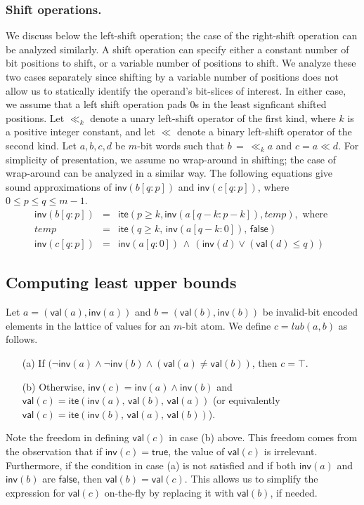\documentclass{llncs}
\newcommand{\val}{\ensuremath{\mathsf{val}}}
\newcommand{\inv}{\ensuremath{\mathsf{inv}}}
\newcommand{\ite}{\ensuremath{\mathsf{ite}}}
\newcommand{\true}{\ensuremath{\mathsf{true}}}
\newcommand{\false}{\ensuremath{\mathsf{false}}}
\begin{document}
\subsubsection{Shift operations.} We discuss below the
left-shift operation; the case of the right-shift operation can be
analyzed similarly.  A shift operation can specify either a constant
number of bit positions to shift, or a variable number of positions to
shift.  We analyze these two cases separately since shifting by a
variable number of positions does not allow us to statically identify
the operand's bit-slices of interest.  In either case, we assume that
a left shift operation pads $0$s in the least signficant shifted
positions.  Let $\ll_k$ denote a unary left-shift operator of the
first kind, where $k$ is a positive integer constant, and let $\ll$
denote a binary left-shift operator of the second kind.  Let $a, b, c,
d$ be $m$-bit words such that $b \,=\, \ll_k a$ and $c = a \ll d$.
For simplicity of presentation, we assume no wrap-around in shifting;
the case of wrap-around can be analyzed in a similar way.  The
following equations give sound approximations of ${\inv}(b[q:p])$ and
${\inv}(c[q:p])$, where $0 \le p \le q \le m-1$.
\vspace*{-0.03in}
\begin{eqnarray}
{\inv}(b[q:p]) \!\!&\!\!=\!\! & \!\! {\ite}(p \ge k, {\inv}(a[q-k:p-k]), temp), \!\!\text{ where }\nonumber \\
temp      \!\!   &\!\! =\!\! & \!\! {\ite}(q \ge k, \,{\inv}(a[q-k:0]), \,{\false}) \!\!\!\!\!\! \!\!\!\!\!\!\!\!\!\! \!\!\!\!\!\!\!\!\!\!\!\!\!\!\!\!  \label{inv-lshift-const}\\
{\inv}(c[q:p]) \!\!& \!\!= \!\! &\!\! {\inv}(a[q:0]) \,\wedge\, ({\inv}(d) \vee ({\val}(d) \leq q)) \!\!\!\!\!\!\!\!\!\!\!\!\!\!\!\!    \!\!\!\!\!\!\!\!\!\!\!\!\!\!\!\!  \label{inv-lshift-var}
\end{eqnarray}


\subsection{Computing least upper bounds}\label{subsec:lub}
Let $a = ({\val}(a), {\inv}(a))$ and $b = ({\val}(b), {\inv}(b))$ be
invalid-bit encoded elements in the lattice of values for an
$m$-bit atom.  We define $c = lub(a, b)$ as follows.
  \begin{itemize}
    \item[(a)] If $(\neg{\inv}(a) \wedge \neg{\inv}(b) \wedge ({\val}(a)
      \ne {\val}(b))$, then $c = \top$.
    \item[(b)] Otherwise, ${\inv}(c) = {\inv}(a) \wedge {\inv}(b)$ and
      ${\val}(c) = {\ite}({\inv}(a), \,{\val}(b), \,{\val}(a))$ (or
      equivalently ${\val}(c) = {\ite}({\inv}(b), \,{\val}(a), \,{\val}(b))$).
  \end{itemize}
Note the freedom in defining ${\val}(c)$ in case (b) above.  This
freedom comes from the observation that if ${\inv}(c) = \true$, the
value of ${\val}(c)$ is irrelevant.  Furthermore, if the condition in
case (a) is not satisfied and if both ${\inv}(a)$ and ${\inv}(b)$ are
$\false$, then ${\val}(b) = {\val}(c)$.  This allows us to simplify
the expression for ${\val}(c)$ on-the-fly by replacing it with
${\val}(b)$, if needed.  
\end{document}
